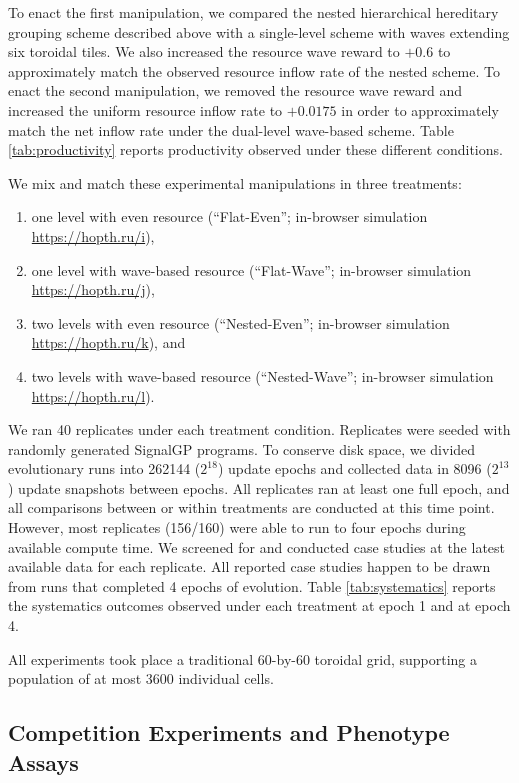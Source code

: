 To enact the first manipulation, we compared the nested hierarchical hereditary grouping scheme described above with a single-level scheme with waves extending six toroidal tiles.
We also increased the resource wave reward to $+0.6$ to approximately match the observed resource inflow rate of the nested scheme.
To enact the second manipulation, we removed the resource wave reward and increased the uniform resource inflow rate to $+0.0175$ in order to approximately match the net inflow rate under the dual-level wave-based scheme.
Table \ref{tab:productivity} reports productivity observed under these different conditions.

We mix and match these experimental manipulations in three treatments:
\begin{enumerate}
\item one level with even resource (``Flat-Even''; in-browser simulation \url{https://hopth.ru/i}),
\item one level with wave-based resource (``Flat-Wave''; in-browser simulation \url{https://hopth.ru/j}),
\item two levels with even resource (``Nested-Even''; in-browser simulation \url{https://hopth.ru/k}), and
\item two levels with wave-based resource (``Nested-Wave''; in-browser simulation \url{https://hopth.ru/l}).
\end{enumerate}

We ran 40 replicates under each treatment condition.
Replicates were seeded with randomly generated SignalGP programs.
To conserve disk space, we divided evolutionary runs into 262144 ($2^{18}$) update epochs and collected data in 8096 ($2^{13}$) update snapshots between epochs.
All replicates ran at least one full epoch, and all comparisons between or within treatments are conducted at this time point.
However, most replicates (156/160) were able to run to four epochs during available compute time.
We screened for and conducted case studies at the latest available data for each replicate.
All reported case studies happen to be drawn from runs that completed 4 epochs of evolution.
Table \ref{tab:systematics} reports the systematics outcomes observed under each treatment at epoch 1 and at epoch 4.

All experiments took place a traditional 60-by-60 toroidal grid, supporting a population of at most 3600 individual cells.

\subsection{Competition Experiments and Phenotype Assays} \label{sup:competition_assays}

